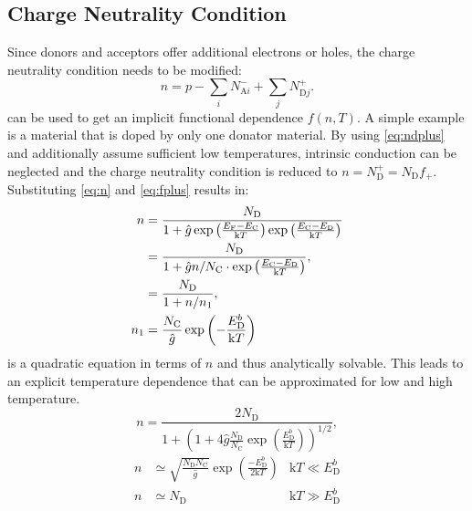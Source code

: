 \subsection{Charge Neutrality Condition}
Since donors and acceptors offer additional electrons or holes, the charge neutrality 
condition needs to be modified:
\begin{equation}
	n = p -\sum_i N_{\mathrm{A}i}^- + \sum_j N_{\mathrm{D}j}^+.
	\label{eq:charge_neutrality}
\end{equation}
 can be used to get an implicit functional dependence $f(n,T)$.
A simple example is a material that is doped by only one donator material.
By using \cref{eq:ndplus} and additionally assume sufficient low
temperatures, intrinsic conduction can be neglected and the charge
neutrality condition is reduced to $n = N_\mathrm{D}^+=N_\mathrm{D} f_+$.
Substituting \cref{eq:n} and \cref{eq:fplus} results in:
\begin{align}
	\notag
	n     & =\frac{N_{\mathrm{D}}}{1+\hat{g}
		\exp\left( \frac{E_{\mathrm{F}}-E_{\mathrm{C}}}{\mathrm{k}T} \right)
	\exp\left( \frac{E_{\mathrm{C}}-E_{\mathrm{D}}}{\mathrm{k}T} \right)}                   \\
	\notag
	      & =\frac{N_{\mathrm{D}}}{1+ \hat{g}n /N_{\mathrm{C}}\cdot
	\exp\left( \frac{E_{\mathrm{C}}-E_{\mathrm{D}}}{\mathrm{k}T} \right)}, \label{eq:n_quad} \\
	      & =\frac{N_{\mathrm{D}}}{1+n / n_{1}},                                             \\
	n_{1} & =	\frac{N_{\mathrm{C}}}{\hat{g}}
	\exp\left( -\frac{E_{\mathrm{D}}^{b}}{\mathrm{k}T} \right)
\end{align}
 is a quadratic equation in terms of $n$ and thus
analytically solvable.
This leads to an explicit temperature dependence that can be approximated
for low and high temperature. 
\begin{equation}
	\label{eq:n_T}
	n = \frac{2N_{\mathrm{D}}}{1+\left( 1+4\hat{g} \frac{N_{\mathrm{D}}}{N_{\mathrm{C}}}
	\exp\left( \frac{E_{\mathrm{D}}^{b}}{\mathrm{k}T} \right) \right)^{1/2}},
\end{equation}
\begin{align}
	\label{eq:n_T_approx_low}
	n & \simeq \sqrt{ \frac{N_{\mathrm{D}}N_{\mathrm{C}}}{\hat{g}} }
	\exp\left( \frac{-E_{\mathrm{D}}^{b}}{2 \mathrm{k}T} \right) & \mathrm{k}T\ll 
	E_{\mathrm{D}}^{b} \\
	\label{eq:n_T_approx_high}
	n & \simeq N_{\mathrm{D}} & \mathrm{k}T\gg E_{\mathrm{D}}^{b}
\end{align}

